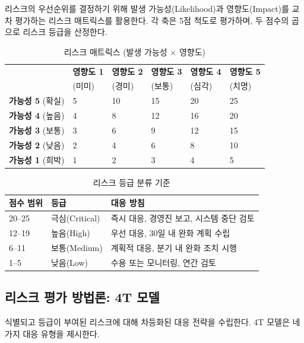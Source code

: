 리스크의 우선순위를 결정하기 위해 발생 가능성(Likelihood)과 영향도(Impact)를 교차 평가하는 리스크 매트릭스를 활용한다. 각 축은 5점 척도로 평가하며, 두 점수의 곱으로 리스크 등급을 산정한다.

\begin{table}[htbp]
\centering
\caption{리스크 매트릭스 (발생 가능성 $\times$ 영향도)}
\label{tab:risk_matrix}
\begin{tabularx}{\textwidth}{p{2.5cm}XXXXX}
\toprule
 & \textbf{영향도 1} & \textbf{영향도 2} & \textbf{영향도 3} & \textbf{영향도 4} & \textbf{영향도 5} \\
 & (미미) & (경미) & (보통) & (심각) & (치명) \\
\midrule
\textbf{가능성 5} (확실) & 5 & 10 & 15 & 20 & 25 \\
\textbf{가능성 4} (높음) & 4 & 8 & 12 & 16 & 20 \\
\textbf{가능성 3} (보통) & 3 & 6 & 9 & 12 & 15 \\
\textbf{가능성 2} (낮음) & 2 & 4 & 6 & 8 & 10 \\
\textbf{가능성 1} (희박) & 1 & 2 & 3 & 4 & 5 \\
\bottomrule
\end{tabularx}
\end{table}

\begin{table}[htbp]
\centering
\caption{리스크 등급 분류 기준}
\label{tab:risk_grade}
\begin{tabularx}{\textwidth}{p{2cm}p{2.5cm}X}
\toprule
\textbf{점수 범위} & \textbf{등급} & \textbf{대응 방침} \\
\midrule
20--25 & 극심(Critical) & 즉시 대응, 경영진 보고, 시스템 중단 검토 \\
12--19 & 높음(High) & 우선 대응, 30일 내 완화 계획 수립 \\
6--11 & 보통(Medium) & 계획적 대응, 분기 내 완화 조치 시행 \\
1--5 & 낮음(Low) & 수용 또는 모니터링, 연간 검토 \\
\bottomrule
\end{tabularx}
\end{table}

\subsection{리스크 평가 방법론: 4T 모델}
\label{sec:5.3.4}

식별되고 등급이 부여된 리스크에 대해 차등화된 대응 전략을 수립한다. 4T 모델은 네 가지 대응 유형을 제시한다.

